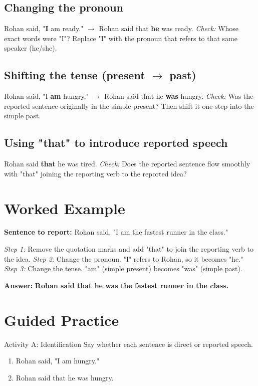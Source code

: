 \subsection*{Changing the pronoun}
Rohan said, "\textbf{I} am ready." $\rightarrow$ Rohan said that \textbf{he} was ready.
\textit{Check:} Whose exact words were "I"? Replace "I" with the pronoun that refers to that same speaker (he/she).

\subsection*{Shifting the tense (present $\rightarrow$ past)}
Rohan said, "I \textbf{am} hungry." $\rightarrow$ Rohan said that he \textbf{was} hungry.
\textit{Check:} Was the reported sentence originally in the simple present? Then shift it one step into the simple past.

\subsection*{Using "that" to introduce reported speech}
Rohan said \textbf{that} he was tired.
\textit{Check:} Does the reported sentence flow smoothly with "that" joining the reporting verb to the reported idea?

\section{Worked Example}
\begin{examplebox}
\textbf{Sentence to report:} Rohan said, "I am the fastest runner in the class."

\textit{Step 1:} Remove the quotation marks and add "that" to join the reporting verb to the idea.
\textit{Step 2:} Change the pronoun. "I" refers to Rohan, so it becomes "he."
\textit{Step 3:} Change the tense. "am" (simple present) becomes "was" (simple past).

\textbf{Answer:} \textbf{Rohan said that he was the fastest runner in the class.}
\end{examplebox}

\section{Guided Practice}
\begin{activitybox}{Activity A: Identification}
Say whether each sentence is direct or reported speech.
\begin{enumerate}
    \item Rohan said, "I am hungry."
    \item Rohan said that he was hungry.
\end{enumerate}
\end{activitybox}

